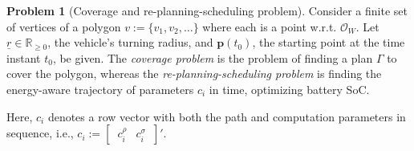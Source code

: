 \documentclass[letterpaper,10pt,journal,twoside]{IEEEtran}
\theoremstyle{definition}
\newtheorem*{pb}{Problem}%
\begin{document}
\begin{pb}[Coverage and re-planning-scheduling problem]
  \label{pb:cov-pb}
  Consider a finite set of vertices of a polygon $v:=\{v_1,v_2,\dots\}$ where each %
  is a point w.r.t. $\mathcal{O}_W$. 
  Let $\underline{r}\in\mathbb{R}_{\geq 0}$, the vehicle's turning radius, and $\mathbf{p}(t_0)$, the starting point at the time instant $t_0$, be given. 
  The \emph{coverage problem} is the problem of finding a plan $\Gamma$ to cover the polygon, whereas the \emph{re-planning-scheduling problem} is finding the {\color{blue}energy-aware} trajectory of parameters $c_i$ in time{\color{blue}, optimizing battery SoC}.
\end{pb}    



Here, $c_i$ denotes a row vector with both the path and computation parameters in sequence, i.e., $c_i:=[\begin{matrix}\,c_i^\rho & c_i^\sigma\,\end{matrix}]'$. %



\end{document}
